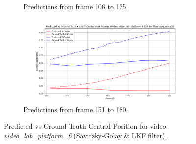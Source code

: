 \documentclass[12pt,oneside]{book} %
\begin{document}
\begin{figure}[H]
\begin{subfigure}[t]{0.45\textwidth}
        \caption{Predictions from frame 106 to 135.}
        \label{fig:framework-video_lab_platform_6-savgol-2}
    \end{subfigure}
    \hfill
    \begin{subfigure}[t]{0.45\textwidth}
        \includegraphics[width=\textwidth]{figures/framework/video_lab_platform_6 LKF SA Filter - 3.png}
        \caption{Predictions from frame 151 to 180.}
        \label{fig:framework-video_lab_platform_6-savgol-3}
    \end{subfigure}
    \caption{Predicted vs Ground Truth Central Position for video \textit{video\_lab\_platform\_6} (Savitzky-Golay \& LKF filter). }
    \label{fig:framework-video_lab_platform_6-savgol}
\end{figure}
\end{document}
